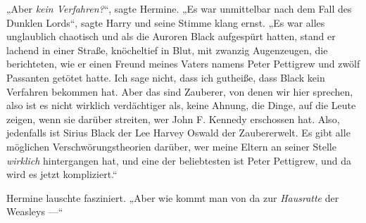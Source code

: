 „Aber \emph{kein Verfahren?}“, sagte Hermine.
„Es war unmittelbar nach dem Fall des Dunklen Lords“, sagte Harry und seine Stimme klang ernst.
„Es war alles unglaublich chaotisch und als die Auroren Black aufgespürt hatten, stand er lachend in einer Straße, knöcheltief in Blut, mit zwanzig Augenzeugen, die berichteten, wie er einen Freund meines Vaters namens Peter Pettigrew und zwölf Passanten getötet hatte. Ich sage nicht, dass ich gutheiße, dass Black kein Verfahren bekommen hat. Aber das sind Zauberer, von denen wir hier sprechen, also ist es nicht wirklich verdächtiger als, keine Ahnung, die Dinge, auf die Leute zeigen, wenn sie darüber streiten, wer John F. Kennedy erschossen hat. Also, jedenfalls ist Sirius Black der Lee Harvey Oswald der Zaubererwelt. Es gibt alle möglichen Verschwörungstheorien darüber, wer meine Eltern an seiner Stelle \emph{wirklich} hintergangen hat, und eine der beliebtesten ist Peter Pettigrew, und da wird es jetzt kompliziert.“

Hermine lauschte fasziniert.
„Aber wie kommt man von da zur \emph{Hausratte} der Weasleys —“

